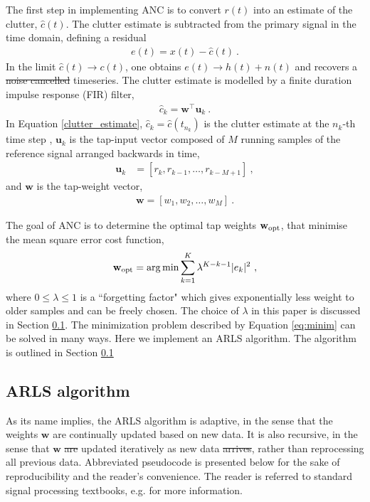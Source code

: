 \documentclass[pra,superscriptaddress,reprint,amsmath,amssymb,nofootinbib]{revtex4-2}
\providecommand{\DIFaddtex}[1]{{\protect\color{blue}\uwave{#1}}} %
\providecommand{\DIFdeltex}[1]{{\protect\color{red}\sout{#1}}}                      %
\providecommand{\DIFaddbegin}{} %
\providecommand{\DIFaddend}{} %
\providecommand{\DIFdelbegin}{} %
\providecommand{\DIFdelend}{} %
\providecommand{\DIFadd}[1]{\texorpdfstring{\DIFaddtex{#1}}{#1}} %
\providecommand{\DIFdel}[1]{\texorpdfstring{\DIFdeltex{#1}}{}} %
\newcommand{\DIFscaledelfig}{0.5}
\newlength{\DIFdelgraphicswidth} %
\newlength{\DIFdelgraphicsheight} %
\newcommand{\DIFaddincludegraphics}[2][]{{\color{blue}\fbox{\DIFOincludegraphics[#1]{#2}}}} %
\newcommand{\DIFdelincludegraphics}[2][]{%
\sbox{\DIFdelgraphicsbox}{\DIFOincludegraphics[#1]{#2}}%
\settoboxwidth{\DIFdelgraphicswidth}{\DIFdelgraphicsbox} %
\settoboxtotalheight{\DIFdelgraphicsheight}{\DIFdelgraphicsbox} %
\scalebox{\DIFscaledelfig}{%
\parbox[b]{\DIFdelgraphicswidth}{\usebox{\DIFdelgraphicsbox}\\[-\baselineskip] \rule{\DIFdelgraphicswidth}{0em}}\llap{\resizebox{\DIFdelgraphicswidth}{\DIFdelgraphicsheight}{%
\setlength{\unitlength}{\DIFdelgraphicswidth}%
\begin{picture}(1,1)%
\thicklines\linethickness{2pt} %
{\color[rgb]{1,0,0}\put(0,0){\framebox(1,1){}}}%
{\color[rgb]{1,0,0}\put(0,0){\line( 1,1){1}}}%
{\color[rgb]{1,0,0}\put(0,1){\line(1,-1){1}}}%
\end{picture}%
}\hspace*{3pt}}} %
} %
\DeclareRobustCommand{\DIFaddbegin}{\DIFOaddbegin \let\includegraphics\DIFaddincludegraphics} %
\DeclareRobustCommand{\DIFaddend}{\DIFOaddend \let\includegraphics\DIFOincludegraphics} %
\DeclareRobustCommand{\DIFdelbegin}{\DIFOdelbegin \let\includegraphics\DIFdelincludegraphics} %
\DeclareRobustCommand{\DIFdelend}{\DIFOaddend \let\includegraphics\DIFOincludegraphics} %
\begin{document}
The first step in implementing ANC is to convert $r(t)$ into an estimate of the clutter, $\hat{c}(t)$. The clutter estimate is subtracted from the primary signal in the time domain, defining a residual
\begin{eqnarray}
	e(t) = x(t) - \hat{c}(t) \ .\label{eq:error_estimate}
\end{eqnarray}
In the limit $\hat{c}(t) \to c(t)$, one obtains	$e(t) \to h(t) + n(t)$ and recovers a \DIFdelbegin \DIFdel{noise cancelled }\DIFdelend \DIFaddbegin \DIFadd{noise-cancelled }\DIFaddend timeseries. The clutter estimate is modelled by a finite duration impulse response (FIR) filter,
\begin{eqnarray}
	\hat{c}_k = \mathbf{w}^{\intercal}\mathbf{u}_k \ . \label{clutter_estimate}
\end{eqnarray}
In Equation \eqref{clutter_estimate}, ${\hat c}_k = {\hat c}(t_{n_k})$ is the clutter estimate at the $n_k$-th time step , $\mathbf{u}_k$ is the tap-input vector composed of $M$ running samples of the reference signal arranged backwards in time,
 \begin{eqnarray}
 	\mathbf{u}_k &= [r_k, r_{k-1}, \dots, r_{k-M+1}] \ ,
 \end{eqnarray}
and $\mathbf{w}$ is the tap-weight vector,
 \begin{eqnarray}
	\mathbf{w} = [w_1, w_{2}, \dots, w_{M}] \ .
\end{eqnarray}

The goal of ANC is to determine the optimal tap weights $\mathbf{w}_{\rm opt}$, that minimise the mean square error cost function,
\begin{eqnarray}
	\mathbf{w}_{\rm opt} = \arg \min \sum_{k=1}^{K} \lambda^{K-k-1} |e_k|^2 \ , \label{eq:minim}
\end{eqnarray}
where $0 \leq \lambda \leq 1$ is a ``forgetting factor" which gives exponentially less weight to older samples and can be freely chosen. The choice of $\lambda$ in this paper is discussed in Section \ref{sec:ARLS}. The minimization problem described by Equation \eqref{eq:minim} can be solved in many ways. Here we implement an ARLS algorithm. The algorithm is outlined in Section \ref{sec:ARLS}\DIFaddbegin \DIFadd{.
}\DIFaddend 

\subsection{ARLS algorithm}
\label{sec:ARLS}

As its name implies, the ARLS algorithm is adaptive, in the sense that the weights $\mathbf{w}$ are continually updated based on new data. It is also recursive, in the sense that $\mathbf{w}$ \DIFdelbegin \DIFdel{are }\DIFdelend \DIFaddbegin \DIFadd{is }\DIFaddend updated iteratively as new data \DIFdelbegin \DIFdel{arrives}\DIFdelend \DIFaddbegin \DIFadd{arrive}\DIFaddend , rather than reprocessing all previous data. Abbreviated pseudocode is presented below for the sake of reproducibility and the reader's convenience. The reader is referred to standard signal processing textbooks, e.g. \cite{HaykinAdaptiveFT:2002} for more information. \newline 
\end{document}

